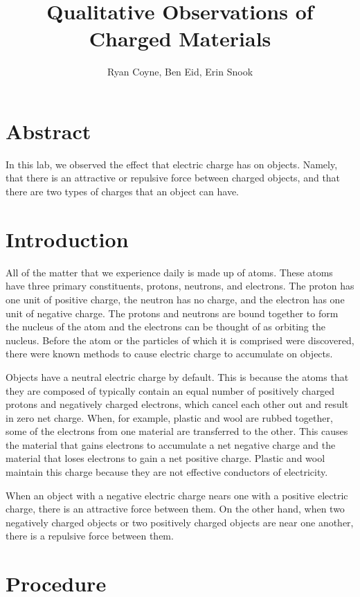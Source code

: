 \documentclass[12pt]{article}
\begin{document}
    \title{Qualitative Observations of Charged Materials}
    \author{Ryan Coyne, Ben Eid, Erin Snook}
    \maketitle

    \section{Abstract}
        In this lab, we observed the effect that electric charge has on objects. Namely, that there is an attractive or repulsive force between charged objects, and that there are two types of charges that an object can have. 
    \section{Introduction}
        All of the matter that we experience daily is made up of atoms. These atoms have three primary constituents, protons, neutrons, and electrons. The proton has one unit of positive charge, the neutron has no charge, and the electron has one unit of negative charge. The protons and neutrons are bound together to form the nucleus of the atom and the electrons can be thought of as orbiting the nucleus. Before the atom or the particles of which it is comprised were discovered, there were known methods to cause electric charge to accumulate on objects.  

        Objects have a neutral electric charge by default. This is because the atoms that they are composed of typically contain an equal number of positively charged protons and negatively charged electrons, which cancel each other out and result in zero net charge. When, for example, plastic and wool are rubbed together, some of the electrons from one material are transferred to the other. This causes the material that gains electrons to accumulate a net negative charge and the material that loses electrons to gain a net positive charge. Plastic and wool maintain this charge because they are not effective conductors of electricity.

        When an object with a negative electric charge nears one with a positive electric charge, there is an attractive force between them. On the other hand, when two negatively charged objects or two positively charged objects are near one another, there is a repulsive force between them. 
    \section{Procedure}
\end{document}
